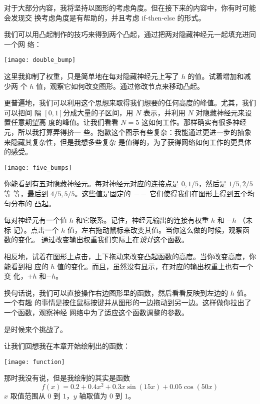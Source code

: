 对于大部分内容，我将坚持以图形的考虑角度。但在接下来的内容中，你有时可能会发现交
换考虑角度是有帮助的，并且考虑 {\serif if-then-else} 的形式。

我们可以用凸起制作的技巧来得到两个凸起，通过把两对隐藏神经元一起填充进同一个网
络：
\begin{center}
  \texttt{[image: double\_bump]}
\end{center}

这里我抑制了权重，只是简单地在每对隐藏神经元上写了 $h$ 的值。试着增加和减少两
个 $h$ 值，观察它如何改变图形。通过修改节点来移动凸起。

更普遍地，我们可以利用这个思想来取得我们想要的任何高度的峰值。尤其，我们可以把间
隔 $[0, 1]$分成大量的子区间，用 $N$ 表示，并利用 $N$ 对隐藏神经元来设置任意期望高
度的峰值。让我们看看 $N = 5$ 这如何工作。那样确实有很多神经元，所以我打算弄得挤一
些。抱歉这个图示有些复杂：我能通过更进一步的抽象来隐藏其复杂性，但是我想多些复杂
是值得的，为了获得网络如何工作的更具体的感受。
\begin{center}
  \texttt{[image: five\_bumps]}
\end{center}
你能看到有五对隐藏神经元。每对神经元对应的连接点是 $0, 1/5$，然后是 $1/5, 2/5$等
等，最后到 $4/5, 5/5$。这些值是固定的 －－ 它们使得我们在图形上得到五个均匀分布的
凸起。

每对神经元有一个值 $h$ 和它联系。记住，神经元输出的连接有权重 $h$ 和 $-h$ （未标
记）。点击一个 $h$ 值，左右拖动鼠标来改变其值。当你这么做的时候，观察函数的变化。
通过改变输出权重我们实际上在\emph{设计}这个函数。

相反地，试着在图形上点击，上下拖动来改变凸起函数的高度。当你改变高度，你能看到相
应的 $h$ 值的变化。而且，虽然没有显示，在对应的输出权重上也有一个变
化，$+h$ 和$-h$。

换句话说，我们可以直接操作右边图形里的函数，然后看看反映到左边的 $h$ 值。一个有趣
的事情是按住鼠标按键并从图形的一边拖动到另一边。这样做你拉出了一个函数，观察神经
网络中为了适应这个函数调整的参数。

是时候来个挑战了。

让我们回想我在本章开始绘制出的函数：
\begin{center}
  \texttt{[image: function]}
\end{center}

那时我没有说，但是我绘制的其实是函数
\begin{equation}
f(x) = 0.2+0.4 x^2+0.3x \sin(15 x) + 0.05 \cos(50 x)
\label{eq:113}\tag{113}
\end{equation}
$x$ 取值范围从 $0$ 到 $1$，$y$ 轴取值为 $0$ 到 $1$。

